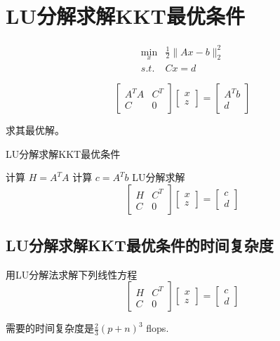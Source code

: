 \section{LU分解求解KKT最优条件}

\begin{problem}
    $$\begin{aligned}
        \min _{x} & \frac{1}{2}\|A x-b\|_{2}^{2}\\
        s.t. & C x=d
    \end{aligned}$$

    $$
\left[\begin{array}{cc}
A^{T} A & C^{T} \\
C & 0
\end{array}\right]\left[\begin{array}{l}
x \\
z
\end{array}\right]=\left[\begin{array}{c}
A^{T} b \\
d
\end{array}\right]
$$

求其最优解。
\end{problem}



\begin{algorithm}[htbp]
    \caption{LU分解求解KKT最优条件}
    计算 $ H=A^{T} A $\;
    计算 $ c=A^{T} b $ \;
    LU分解求解$$
    \left[\begin{array}{cc}
    H & C^{T} \\
    C & 0
    \end{array}\right]\left[\begin{array}{l}
    x \\
    z
    \end{array}\right]=\left[\begin{array}{l}
    c \\
    d
    \end{array}\right]
    $$\;
\end{algorithm}

\subsection{LU分解求解KKT最优条件的时间复杂度}

\begin{theorem}
    用LU分解法求解下列线性方程 
$$
\left[\begin{array}{cc}
H & C^{T} \\
C & 0
\end{array}\right]\left[\begin{array}{l}
x \\
z
\end{array}\right]=\left[\begin{array}{l}
c \\
d
\end{array}\right]
$$

需要的时间复杂度是$ \frac{2}{3}(p+n)^{3} $ flops.
\end{theorem}

